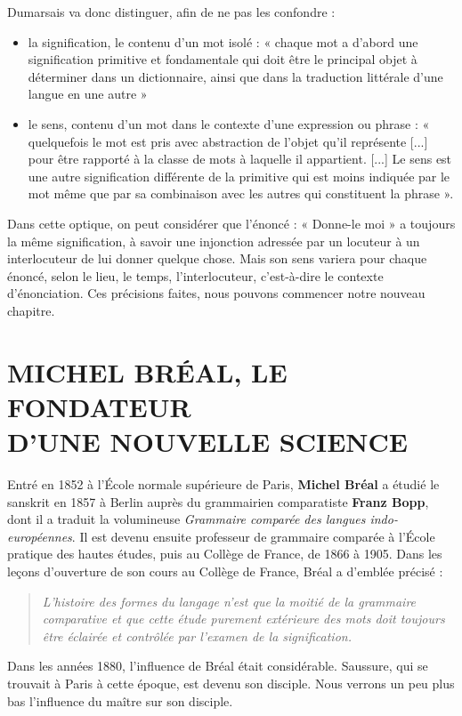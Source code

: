 \begin{keybox}[Introduction]
Dumarsais va donc distinguer, afin de ne pas les confondre :
\begin{itemize}
\item la signification, le contenu d’un mot isolé : « chaque mot a d’abord une signification primitive et fondamentale qui doit être le principal objet à déterminer dans un dictionnaire, ainsi que dans la traduction littérale d’une langue en une autre »
\item le sens, contenu d’un mot dans le contexte d’une expression ou phrase : « quelquefois le mot est pris avec abstraction de l’objet qu’il représente [...] pour être rapporté à la classe de mots à laquelle il appartient. [...] Le sens est une autre signification différente de la primitive qui est moins indiquée par le mot même que par sa combinaison avec les autres qui constituent la phrase ».
\end{itemize}
Dans cette optique, on peut considérer que l’énoncé : « Donne-le moi » a toujours la même signification, à savoir une injonction adressée par un locuteur à un interlocuteur de lui donner quelque chose. Mais son sens variera pour chaque énoncé, selon le lieu, le temps, l’interlocuteur, c’est-à-dire le contexte d’énonciation. Ces précisions faites, nous pouvons commencer notre nouveau chapitre.
\end{keybox}

\section[MICHEL BRÉAL, LE FONDATEUR D’UNE NOUVELLE SCIENCE]{MICHEL BRÉAL, LE FONDATEUR\\D’UNE NOUVELLE SCIENCE}
Entré en 1852 à l’École normale supérieure de Paris, \textbf{Michel Bréal} a étudié le sanskrit en 1857 à Berlin auprès du grammairien comparatiste \textbf{Franz Bopp}, dont il a traduit la volumineuse \textit{Grammaire comparée des langues indo-européennes}. Il est devenu ensuite professeur de grammaire comparée à l’École pratique des hautes études, puis au Collège de France, de 1866 à 1905. Dans les leçons d’ouverture de son cours au Collège de France, Bréal a d’emblée précisé :
\begin{quote}\small\itshape
L’histoire des formes du langage n’est que la moitié de la grammaire comparative et que cette étude purement extérieure des mots doit toujours être éclairée et contrôlée par l’examen de la signification.
\end{quote}
Dans les années 1880, l’influence de Bréal était considérable. Saussure, qui se trouvait à Paris à cette époque, est devenu son disciple. Nous verrons un peu plus bas l’influence du maître sur son disciple.

